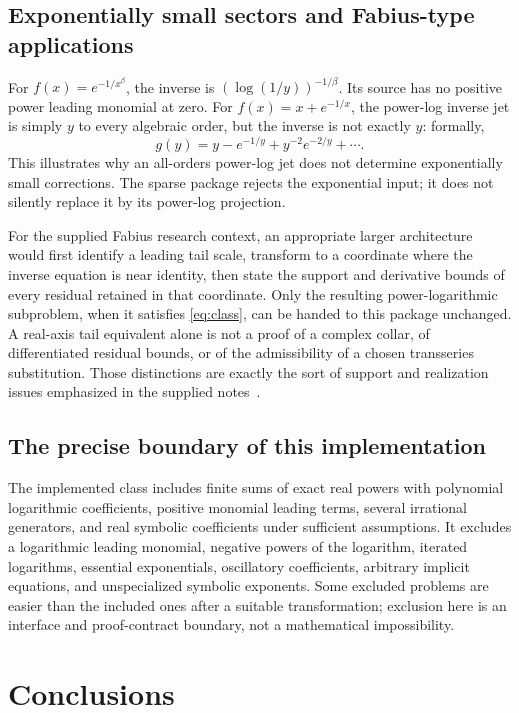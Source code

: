 \documentclass[11pt,a4paper]{article}
\numberwithin{equation}{section}
\theoremstyle{definition}\newtheorem{definition}[theorem]{Definition}
\theoremstyle{remark}\newtheorem{remark}[theorem]{Remark}
\begin{document}
\subsection{Exponentially small sectors and Fabius-type applications}
For \(f(x)=e^{-1/x^\beta}\), the inverse is
\((\log(1/y))^{-1/\beta}\). Its source has no positive power leading
monomial at zero. For \(f(x)=x+e^{-1/x}\), the power-log inverse jet is simply
\(y\) to every algebraic order, but the inverse is not exactly \(y\): formally,
\[
 g(y)=y-e^{-1/y}+y^{-2}e^{-2/y}+\cdots.
\]
This illustrates why an all-orders power-log jet does not determine
exponentially small corrections. The sparse package rejects the exponential
input; it does not silently replace it by its power-log projection.

For the supplied Fabius research context, an appropriate larger architecture
would first identify a leading tail scale, transform to a coordinate where
the inverse equation is near identity, then state the support and derivative
bounds of every residual retained in that coordinate. Only the resulting
power-logarithmic subproblem, when it satisfies \eqref{eq:class}, can be
handed to this package unchanged. A real-axis tail equivalent alone is not
a proof of a complex collar, of differentiated residual bounds, or of the
admissibility of a chosen transseries substitution. Those distinctions are
exactly the sort of support and realization issues emphasized in the
supplied notes~\cite{proveit}.

\subsection{The precise boundary of this implementation}
The implemented class includes finite sums of exact real powers with
polynomial logarithmic coefficients, positive monomial leading terms,
several irrational generators, and real symbolic coefficients under
sufficient assumptions. It excludes a logarithmic leading monomial,
negative powers of the logarithm, iterated logarithms, essential
exponentials, oscillatory coefficients, arbitrary implicit equations,
and unspecialized symbolic exponents. Some excluded problems are easier
than the included ones after a suitable transformation; exclusion here is
an interface and proof-contract boundary, not a mathematical impossibility.

\section{Conclusions}
\end{document}
